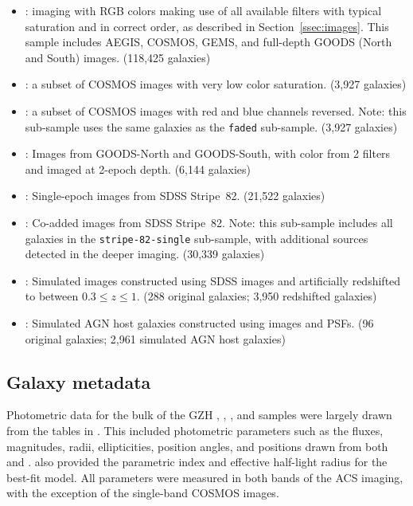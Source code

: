 \documentclass[twocolumn]{aastex6}
\begin{document}
\begin{itemize}

\item \main: \hst{} imaging with RGB colors making use of all available
filters with typical saturation and in correct order, as described in
Section~\ref{ssec:images}. This sample includes AEGIS, COSMOS, GEMS, and
full-depth GOODS (North and South) images. (118,425 galaxies)

\item \faded: a subset of COSMOS images with very low color saturation.
(3,927 galaxies)

\item \recolored: a subset of COSMOS images with red and blue channels
reversed. Note: this sub-sample uses the same galaxies as the \texttt{faded}
sub-sample. (3,927 galaxies)

\item \goods: Images from GOODS-North and GOODS-South, with
color from 2 filters and imaged at 2-epoch depth. (6,144 galaxies)

\item \stripe: Single-epoch images from SDSS Stripe~82.
(21,522 galaxies)

\item \coadd: Co-added images from SDSS Stripe~82. Note: this
sub-sample includes all galaxies in the \texttt{stripe-82-single} sub-sample,
with additional sources detected in the deeper imaging. (30,339 galaxies)

\item \redshifted: Simulated \hst{} images constructed using SDSS
images and artificially redshifted to between $0.3 \leq z \leq 1$. (288
original galaxies; 3,950 redshifted galaxies)

\item \simagn: Simulated AGN host galaxies constructed using
\hst{} images and PSFs. (96 original galaxies; 2,961 simulated AGN host
galaxies)


\end{itemize}


\subsection{Galaxy metadata}

Photometric data for the bulk of the GZH \main, \faded, \recolored, and \goods{}
samples were largely drawn from the tables in \citet{gri12}. This included
photometric parameters such as the fluxes, magnitudes, radii, ellipticities,
position angles, and positions drawn from both \sextractor{} and \galfit.
\galfit{} also provided the parametric \sersic{} index and effective half-light
radius for the best-fit model. All parameters were measured in both bands of
the ACS imaging, with the exception of the single-band COSMOS images.
\end{document}
